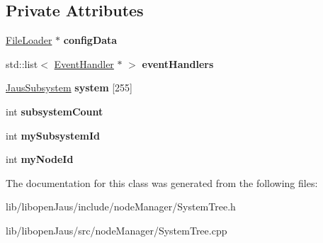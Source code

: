 \subsection*{\-Private \-Attributes}
\begin{DoxyCompactItemize}
\item 
\hypertarget{class_system_tree_a8a0c07094d598f1132737ebf877e5b01}{\hyperlink{class_file_loader}{\-File\-Loader} $\ast$ {\bfseries config\-Data}}\label{class_system_tree_a8a0c07094d598f1132737ebf877e5b01}

\item 
\hypertarget{class_system_tree_af1278d7675dba9439bacae7fefb767b0}{std\-::list$<$ \hyperlink{class_event_handler}{\-Event\-Handler} $\ast$ $>$ {\bfseries event\-Handlers}}\label{class_system_tree_af1278d7675dba9439bacae7fefb767b0}

\item 
\hypertarget{class_system_tree_a1beb6de6eac01c7628356487cc3944e9}{\hyperlink{struct_jaus_subsystem_struct}{\-Jaus\-Subsystem} {\bfseries system} \mbox{[}255\mbox{]}}\label{class_system_tree_a1beb6de6eac01c7628356487cc3944e9}

\item 
\hypertarget{class_system_tree_a1c9da8825ccdeb0dec8e5ae0fc365dfc}{int {\bfseries subsystem\-Count}}\label{class_system_tree_a1c9da8825ccdeb0dec8e5ae0fc365dfc}

\item 
\hypertarget{class_system_tree_aa90cf774c09d27da4cd4ef1190a72259}{int {\bfseries my\-Subsystem\-Id}}\label{class_system_tree_aa90cf774c09d27da4cd4ef1190a72259}

\item 
\hypertarget{class_system_tree_a6562c395345d884fed8b3109422bea31}{int {\bfseries my\-Node\-Id}}\label{class_system_tree_a6562c395345d884fed8b3109422bea31}

\end{DoxyCompactItemize}


\-The documentation for this class was generated from the following files\-:\begin{DoxyCompactItemize}
\item 
lib/libopen\-Jaus/include/node\-Manager/\-System\-Tree.\-h\item 
lib/libopen\-Jaus/src/node\-Manager/\-System\-Tree.\-cpp\end{DoxyCompactItemize}
